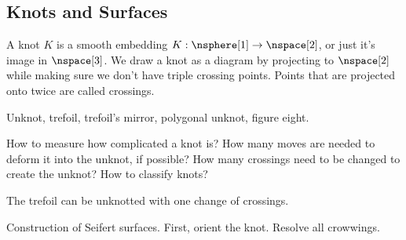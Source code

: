     \subsection{Knots and Surfaces}
        \begin{definition}
            A knot $K$ is a smooth embedding
            $K:\nsphere[1]\rightarrow\nspace[2]$, or just it's image in
            $\nspace[3]$. We draw a knot as a diagram by projecting to
            $\nspace[2]$ while making sure we don't have triple crossing points.
            Points that are projected onto twice are called crossings.
        \end{definition}
        \begin{example}
            Unknot, trefoil, trefoil's mirror, polygonal unknot, figure eight.
        \end{example}
        How to measure how complicated a knot is? How many moves are needed
        to deform it into the unknot, if possible? How many crossings need
        to be changed to create the unknot? How to classify knots?
        \begin{example}
            The trefoil can be unknotted with one change of crossings.
        \end{example}
        Construction of Seifert surfaces. First, orient the knot. Resolve all
        crowwings.